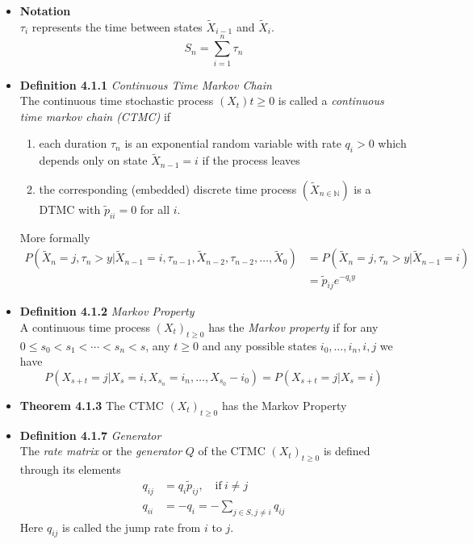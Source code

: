 \documentclass[11pt,a4paper]{article}
\begin{document}
\begin{itemize}
    \item \textbf{Notation} \\
        $\tau_i$ represents the time between states $\widetilde{X}_{i-1}$ and $\widetilde{X}_i$.
        \[
            S_n = \sum_{i=1}^n \tau_n
        \]
    \item \textbf{Definition 4.1.1} \emph{Continuous Time Markov Chain} \\
        The continuous time stochastic process $(X_t){t \geq 0}$ is called a
        \emph{continuous time markov chain (CTMC)} if
        \begin{enumerate}
            \item each duration $\tau_n$ is an exponential random variable with rate $q_i > 0$
                which depends only on state $\widetilde{X}_{n-1} = i$  if the process leaves
            \item the corresponding (embedded) discrete time process
                $(\widetilde{X}_{n \in \mathbb{N}})$ is a DTMC with $\widetilde{p}_{ii} = 0$
                for all $i$.
        \end{enumerate}
        More formally
        \begin{align*}{}
            P(\widetilde{X}_n = j, \tau_n > y | \widetilde{X}_{n-1} = i, \tau_{n-1},
            \widetilde{X}_{n-2}, \tau_{n-2}, \ldots, \widetilde{X}_0)
            &= P(\widetilde{X}_n = j, \tau_n > y | \widetilde{X}_{n-1} = i) \\
            &= \widetilde{p}_{ij} e^{-q_i y}
        \end{align*}
    \item \textbf{Definition 4.1.2} \emph{Markov Property} \\
        A continuous time process ${(X_t)}_{t \geq 0}$ has the \emph{Markov property} if
        for any $0 \leq s_0 < s_1 < \cdots < s_n < s$, any $t \geq 0$ and any possible states
        $i_0, \ldots, i_n, i, j$ we have
        \[
            P(X_{s+t} = j | X_s = i, X_{s_n} = i_n, \ldots, X_{s_0} - i_0) =
            P(X_{s+t} = j | X_s = i)
        \]
    \item \textbf{Theorem 4.1.3} The CTMC ${(X_t)}_{t \geq 0}$ has the Markov Property
    \item \textbf{Definition 4.1.7} \emph{Generator} \\
        The \emph{rate matrix} or the \emph{generator} $Q$ of the CTMC
        ${(X_t)}_{t\geq0}$ is defined through its elements
        \begin{align*}{}
            q_{ij} &= q_i \widetilde{p}_{ij}, \quad \text{if} \ i \neq j \\
            q_{ii} &= -q_i = - \sum_{j \in S, j \neq i} q_{ij}
        \end{align*}
        Here $q_{ij}$ is called the jump rate from $i$ to $j$.
\end{itemize}
\end{document}

